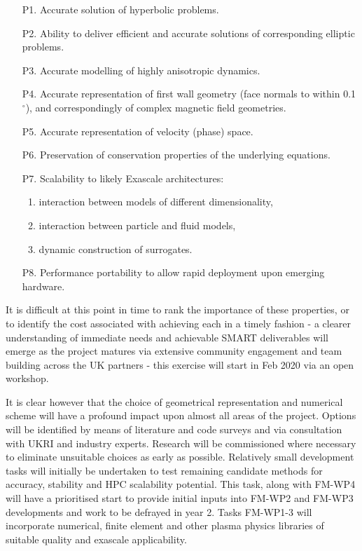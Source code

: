 \begin{itemize}
\item[P1.] Accurate solution of hyperbolic problems.

\item[P2.] Ability to deliver efficient and accurate solutions of corresponding elliptic 
problems.

\item[P3.] Accurate modelling of highly anisotropic dynamics. 

\item[P4.] Accurate representation of first wall geometry (face normals to within 0.1$^\circ$), 
and correspondingly of complex magnetic field geometries.

\item[P5.] Accurate representation of velocity (phase) space.

\item[P6.] Preservation of conservation properties of the underlying equations.

\item[P7.] Scalability to likely Exascale architectures:

\begin{enumerate}
\item interaction between models of different dimensionality,

\item interaction between particle and fluid models,

\item dynamic construction of surrogates.
\end{enumerate}

\item[P8.] Performance portability to allow rapid deployment upon emerging hardware.
\end{itemize}

It is difficult at this point in time to rank the importance of these properties, 
or to identify the cost associated with achieving each in a timely fashion - a 
clearer understanding of immediate needs and achievable SMART deliverables will 
emerge as the project matures via extensive community engagement and team building 
across the UK partners - this exercise will start in Feb 2020 via an open workshop. 

It is clear however that the choice of geometrical representation and numerical 
scheme will have a profound impact upon almost all areas of the project. Options 
will be identified by means of literature and code surveys and via consultation 
with UKRI and industry experts. Research will be commissioned where necessary to 
eliminate unsuitable choices as early as possible. Relatively small development 
tasks will initially be undertaken to test remaining candidate methods for accuracy, 
stability and HPC scalability potential.  This task, along with FM-WP4 will have 
a prioritised start to provide initial inputs into FM-WP2 and FM-WP3 developments 
and work to be defrayed in year 2. Tasks FM-WP1-3 will incorporate numerical, finite 
element and other plasma physics libraries of suitable quality and exascale applicability.

